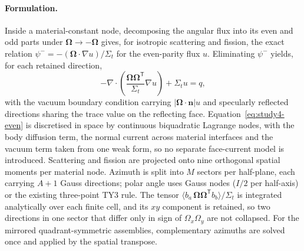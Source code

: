 \paragraph{Formulation.}
Inside a material-constant node, decomposing the angular flux into its even
and odd parts under $\boldsymbol{\Omega}\rightarrow-\boldsymbol{\Omega}$
gives, for isotropic scattering and fission, the exact relation
$\psi^{-}=-(\boldsymbol{\Omega}\cdot\nabla u)/\Sigma_t$ for the even-parity
flux $u$. Eliminating $\psi^{-}$ yields, for each retained direction,
\begin{equation}
-\nabla\cdot\!\left(\frac{\boldsymbol{\Omega}\boldsymbol{\Omega}^{\mathsf T}}{\Sigma_t}\nabla u\right)
+\Sigma_t u = q ,
\label{eq:study4-even}
\end{equation}
with the vacuum boundary condition carrying $|\boldsymbol{\Omega}\cdot\mathbf{n}|u$
and specularly reflected directions sharing the trace value on the reflecting
face. Equation~\eqref{eq:study4-even} is discretised in space by continuous
biquadratic Lagrange nodes, with the body diffusion term, the normal current
across material interfaces and the vacuum term taken from one weak form, so
no separate face-current model is introduced. Scattering and fission are
projected onto nine orthogonal spatial moments per material node. Azimuth is
split into $M$ sectors per half-plane, each carrying $A{+}1$ Gauss
directions; polar angle uses Gauss nodes ($I/2$ per half-axis) or the
existing three-point TY3 rule. The tensor
$\langle b_a\,\boldsymbol{\Omega}\boldsymbol{\Omega}^{\mathsf T}b_b\rangle/\Sigma_t$
is integrated analytically over each finite cell, and its $xy$ component is
retained, so two directions in one sector that differ only in sign of
$\Omega_x\Omega_y$ are not collapsed. For the mirrored quadrant-symmetric
assemblies, complementary azimuths are solved once and applied by the spatial
transpose.

